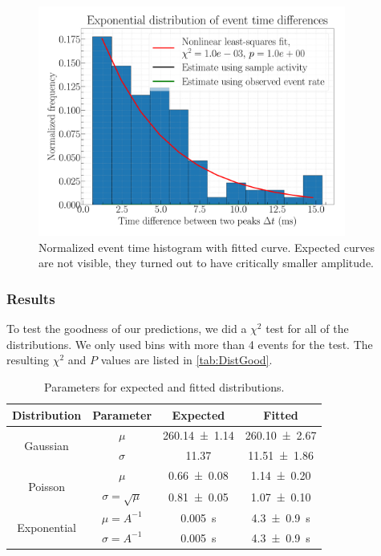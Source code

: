 \begin{figure}[H]
\centering
\includegraphics[width=0.9\textwidth]{../Figures/Geiger_eventtime_histogram_fit.pdf}
\caption{Normalized event time histogram with fitted curve. Expected curves are not visible, they turned out to have critically smaller amplitude.}
\label{fig:ExpFit}
\end{figure}

\subsubsection{Results}

To test the goodness of our predictions, we did a $\chi^2$ test for all of the distributions. We only used bins with more than 4 events for the test. The resulting $\chi^2$ and $P$ values are listed in \cref{tab:DistGood}.

\begin{table}[H]
	\renewcommand{\arraystretch}{1.5}
	\centering
	\begin{tabular}{|c|c|c|c|}
		\hline
		Distribution & Parameter & Expected & Fitted \\
		\hline
		\multirow{2}{*}{Gaussian} & $\mu$ & \SI{260.14 \pm 1.14}{} & \SI{260.10 \pm 2.67}{} \\
		 & $\sigma$ & \SI{11.37}{} & \SI{11.51 \pm 1.86}{} \\
		\hline
		\multirow{2}{*}{Poisson} & $\mu$ & \SI{0.66 \pm 0.08}{} & \SI{1.14 \pm 0.20}{} \\
		 & $\sigma = \sqrt{\mu}$ & \SI{0.81 \pm 0,05}{} & \SI{1,07 \pm 0,10}{} \\
		\hline
		\multirow{2}{*}{Exponential} & $\mu = A^{-1}$ & \SI{0.005}{s} & \SI{4.3+-0.9}{s} \\
		 & $\sigma  = A^{-1} $ & \SI{0.005}{s} & \SI{4.3+-0.9}{s} \\
		\hline
	\end{tabular}
	\caption{Parameters for expected and fitted distributions.}
	\label{tab:DistPara}
\end{table}

